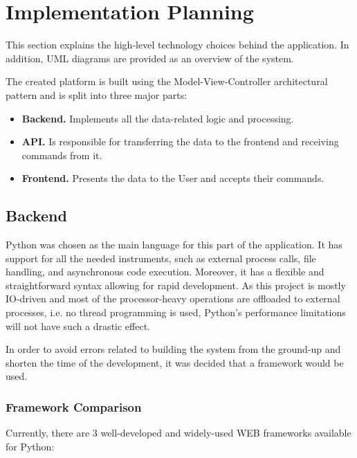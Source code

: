 \chapter{Implementation Planning}\label{chap:planning}

This section explains the high-level technology choices behind the application.
In addition, UML diagrams are provided as an overview of the system.

The created platform is built using the Model-View-Controller \cite{mvc} architectural pattern
and is split into three major parts:
\begin{itemize}
    \item \textbf{Backend.} Implements all the data-related logic and processing.
    \item \textbf{API.} Is responsible for transferring the data to the frontend and receiving commands from it.
    \item \textbf{Frontend.} Presents the data to the User and accepts their commands.
\end{itemize}


\section{Backend}
Python\cite{python} was chosen as the main language for this part of the application.
It has support for all the needed instruments, such as external process calls,
file handling, and asynchronous code execution. Moreover, it has a flexible and straightforward
syntax allowing for rapid development.
As this project is mostly IO-driven and most of the processor-heavy operations are offloaded to external processes,
i.e. no thread programming is used, Python's performance limitations\cite{gil} will not have such a drastic effect.

In order to avoid errors related to building the system from the ground-up
and shorten the time of the development, it was decided that a framework would be used.

\subsection{Framework Comparison}
Currently, there are 3 well-developed and widely-used WEB frameworks available for Python:

